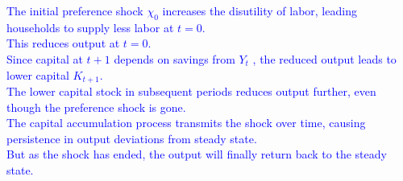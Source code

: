 \begin{solution}
    \textcolor{blue}{
        The initial preference shock $\chi _0$ increases the disutility of labor, leading households to supply less labor at $t=0$. \\
        This reduces output at $t=0$.\\
        Since capital at $t+1$ depends on savings from $Y_t$ , the reduced output leads to lower capital $K_{t+1}$. \\
        The lower capital stock in subsequent periods reduces output further, even though the preference shock is gone.\\
        The capital accumulation process transmits the shock over time, causing persistence in output deviations from steady state.\\
        But as the shock has ended, the output will finally return back to the steady state.
    }
\end{solution}